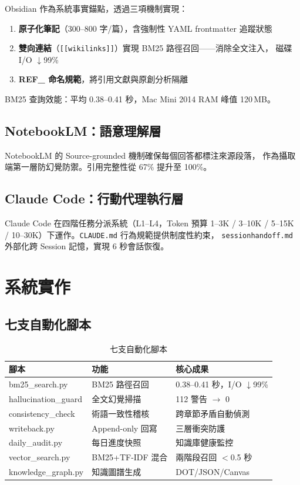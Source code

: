 \documentclass[conference]{IEEEtran}
\begin{document}
Obsidian 作為系統事實錨點，透過三項機制實現：
\begin{enumerate}
  \item \textbf{原子化筆記}（300--800 字/篇），含強制性 YAML frontmatter 追蹤狀態
  \item \textbf{雙向連結}（\texttt{[[wikilinks]]}）實現 BM25 路徑召回——消除全文注入，
        磁碟 I/O $\downarrow$99\%
  \item \textbf{REF\_ 命名規範}，將引用文獻與原創分析隔離
\end{enumerate}

BM25 查詢效能：平均 0.38--0.41 秒，Mac Mini 2014 RAM 峰值 120\,MB。

\subsection{NotebookLM：語意理解層}

NotebookLM 的 Source-grounded 機制確保每個回答都標注來源段落，
作為攝取端第一層防幻覺防禦。引用完整性從 67\% 提升至 100\%。

\subsection{Claude Code：行動代理執行層}

Claude Code 在四階任務分派系統（L1--L4，Token 預算 1--3K / 3--10K / 5--15K /
10--30K）下運作。\texttt{CLAUDE.md} 行為規範提供制度性約束，
\texttt{sessionhandoff.md} 外部化跨 Session 記憶，實現 6 秒會話恢復。

\section{系統實作}

\subsection{七支自動化腳本}

\begin{table}[ht]
\caption{七支自動化腳本}
\label{tab:scripts}
\centering
\begin{tabular}{p{2.4cm}p{2.2cm}p{2.6cm}}
\toprule
\textbf{腳本} & \textbf{功能} & \textbf{核心成果} \\
\midrule
bm25\_search.py      & BM25 路徑召回      & 0.38--0.41 秒，I/O $\downarrow$99\% \\
hallucination\_guard & 全文幻覺掃描        & 112 警告 $\to$ 0 \\
consistency\_check   & 術語一致性稽核      & 跨章節矛盾自動偵測 \\
writeback.py         & Append-only 回寫   & 三層衝突防護 \\
daily\_audit.py      & 每日進度快照        & 知識庫健康監控 \\
vector\_search.py    & BM25+TF-IDF 混合   & 兩階段召回 $<$0.5 秒 \\
knowledge\_graph.py  & 知識圖譜生成        & DOT/JSON/Canvas \\
\bottomrule
\end{tabular}
\end{table}
\end{document}
